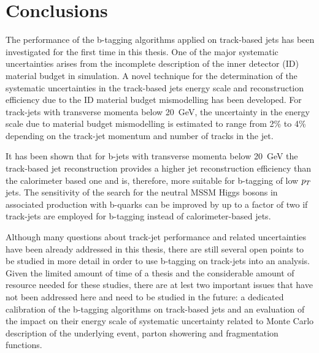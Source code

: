 \section{Conclusions}\label{sec:trackjetsconclusion}
The performance of the b-tagging algorithms applied on track-based jets has been investigated for the first time in this thesis.
One of the major systematic uncertainties arises from the incomplete description of the inner detector (ID) material
 budget in simulation.
A novel technique for the determination of  the systematic uncertainties in the track-based jets energy scale and
reconstruction efficiency  due to the ID material budget mismodelling  has been developed. 
For track-jets with transverse momenta below 20~GeV, the  uncertainty  in the energy scale  due to 
material budget mismodelling is estimated to range from 2\% to 4\% depending on the track-jet 
momentum and number of  tracks in the jet.

It has been shown that for b-jets with transverse momenta below 20~GeV the track-based jet reconstruction provides a higher
jet reconstruction efficiency than the calorimeter based one and is, therefore, more suitable  for
b-tagging of low $p_{T}$ jets. The sensitivity of the search for the neutral MSSM Higgs bosons
in associated production with b-quarks can be improved by
up to a factor of two if track-jets are employed for b-tagging instead of  calorimeter-based jets.

Although many questions about track-jet performance and related uncertainties have been already addressed in this thesis, 
there are still several open points to be studied in more detail in order to use b-tagging on 
track-jets into an analysis. Given the limited amount of time of a thesis and the considerable amount of resource needed for 
these studies, there are at lest two important issues that  have not been addressed here and need to be studied in the future:
a dedicated calibration of the b-tagging algorithms on track-based jets  and an evaluation of the impact on 
their energy scale of  systematic uncertainty related to Monte Carlo description of the underlying event, parton showering
and fragmentation functions. 





















